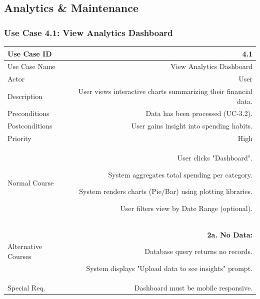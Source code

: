 \documentclass[11pt,a4paper]{report}
\begin{document}
\newpage

\subsection{Analytics \& Maintenance}

\subsubsection{Use Case 4.1: View Analytics Dashboard}
\begin{tabularx}{\textwidth}{|L|R|}
	\hline
	Use Case ID & 4.1 \\ \hline
	Use Case Name & View Analytics Dashboard \\ \hline
	Actor & User \\ \hline
	Description & User views interactive charts summarizing their financial data. \\ \hline
	Preconditions & Data has been processed (UC-3.2). \\ \hline
	Postconditions & User gains insight into spending habits. \\ \hline
	Priority & High \\ \hline
	Normal Course & 
	\begin{normalsteps}
		\item User clicks "Dashboard".
		\item System aggregates total spending per category.
		\item System renders charts (Pie/Bar) using plotting libraries.
		\item User filters view by Date Range (optional).
	\end{normalsteps} \\ \hline
	Alternative Courses & 
	\textbf{2a. No Data:} 
	\begin{altsteps}
		\item Database query returns no records.
		\item System displays "Upload data to see insights" prompt.
	\end{altsteps} \\ \hline
	Special Req. & Dashboard must be mobile responsive. \\ \hline
\end{tabularx}

\vspace{0.5cm}

\end{document}
